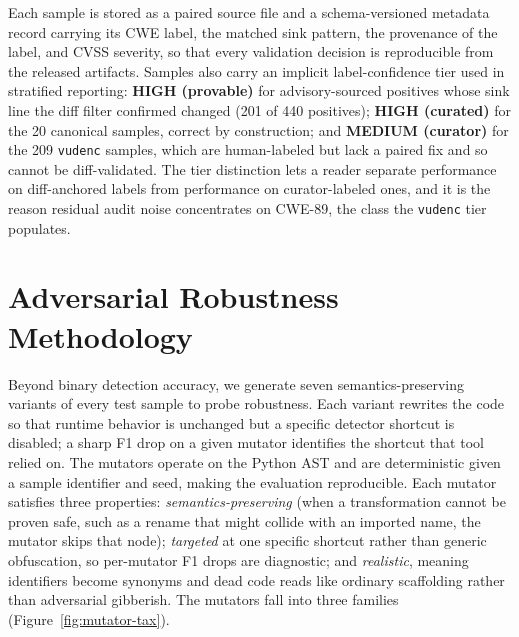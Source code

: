 \documentclass[conference]{IEEEtran}
\begin{document}
Each sample is stored as a paired source file and a schema-versioned
metadata record carrying its CWE label, the matched sink pattern, the
provenance of the label, and CVSS severity, so that every validation
decision is reproducible from the released artifacts. Samples also carry
an implicit label-confidence tier used in stratified reporting:
\textbf{HIGH (provable)} for advisory-sourced positives whose sink line
the diff filter confirmed changed (201 of 440 positives);
\textbf{HIGH (curated)} for the 20 canonical samples, correct by
construction; and \textbf{MEDIUM (curator)} for the 209 \texttt{vudenc}
samples, which are human-labeled but lack a paired fix and so cannot be
diff-validated. The tier distinction lets a reader separate performance
on diff-anchored labels from performance on curator-labeled ones, and it
is the reason residual audit noise concentrates on CWE-89, the class the
\texttt{vudenc} tier populates.

\section{Adversarial Robustness Methodology}
\label{sec:method}

Beyond binary detection accuracy, we generate seven semantics-preserving
variants of every test sample to probe robustness. Each variant rewrites
the code so that runtime behavior is unchanged but a specific detector
shortcut is disabled; a sharp F1 drop on a given mutator identifies the
shortcut that tool relied on. The mutators operate on the Python AST and
are deterministic given a sample identifier and seed, making the
evaluation reproducible. Each mutator satisfies three properties:
\emph{semantics-preserving} (when a transformation cannot be proven safe,
such as a rename that might collide with an imported name, the mutator
skips that node); \emph{targeted} at one specific shortcut rather than
generic obfuscation, so per-mutator F1 drops are diagnostic; and
\emph{realistic}, meaning identifiers become synonyms and dead code reads
like ordinary scaffolding rather than adversarial gibberish. The mutators
fall into three families (Figure~\ref{fig:mutator-tax}).
\end{document}
